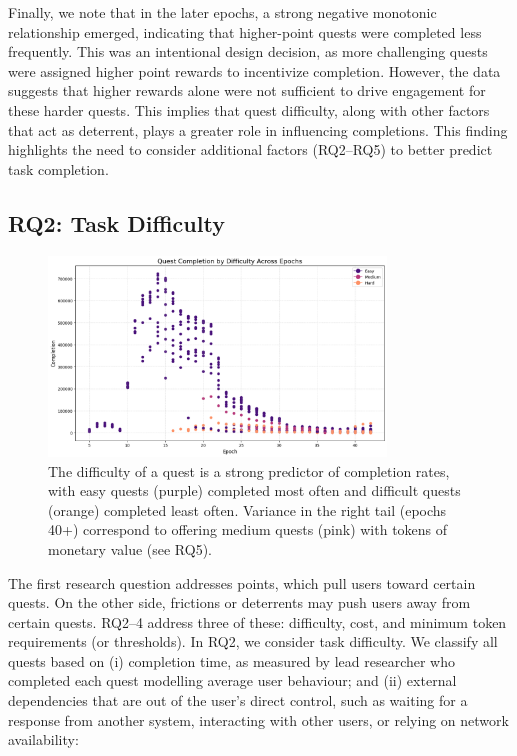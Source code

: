 Finally, we note that in the later epochs, a strong negative monotonic relationship emerged, indicating that higher-point quests were completed less frequently. This was an intentional design decision, as more challenging quests were assigned higher point rewards to incentivize completion. However, the data suggests that higher rewards alone were not sufficient to drive engagement for these harder quests. This implies that quest difficulty, along with other factors that act as deterrent, plays a greater role in influencing completions. This finding highlights the need to consider additional factors (RQ2–RQ5) to better predict task completion.


\subsection{RQ2: Task Difficulty}

\begin{figure}[t]
    \centering
    \includegraphics[width=0.8\textwidth]{figures/difficulty.png}
    \caption{The difficulty of a quest is a strong predictor of completion rates, with easy quests (purple) completed most often and difficult quests (orange) completed least often. Variance in the right tail (epochs 40+) correspond to offering medium quests (pink) with tokens of monetary value (see RQ5).\label{fig:difficulty}}
\end{figure}

The first research question addresses points, which pull users toward certain quests. On the other side, frictions or deterrents may push users away from certain quests. RQ2--4 address three of these: difficulty, cost, and minimum token requirements (or thresholds). In RQ2, we consider task difficulty. We classify all quests based on (i) completion time, as measured by lead researcher who completed each quest modelling average user behaviour; and (ii) external dependencies that are out of the user's direct control, such as waiting for a response from another system, interacting with other users, or relying on network availability:


